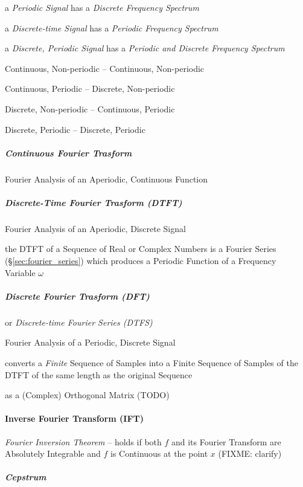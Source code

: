 {a \emph{Periodic Signal} has a \emph{Discrete Frequency Spectrum}

a \emph{Discrete-time Signal} has a \emph{Periodic Frequency Spectrum}

a \emph{Discrete, Periodic Signal} has a \emph{Periodic and Discrete Frequency
  Spectrum}

Continuous, Non-periodic -- Continuous, Non-periodic

Continuous, Periodic -- Discrete, Non-periodic

Discrete, Non-periodic -- Continuous, Periodic

Discrete, Periodic -- Discrete, Periodic



\subparagraph{Continuous Fourier Trasform}
\label{sec:continuous_fourier_transform}\hfill

Fourier Analysis of an Aperiodic, Continuous Function



\subparagraph{Discrete-Time Fourier Trasform (DTFT)}\label{sec:dtft}\hfill

Fourier Analysis of an Aperiodic, Discrete Signal

the DTFT of a Sequence of Real or Complex Numbers is a Fourier Series
(\S\ref{sec:fourier_series}) which produces a Periodic Function of a Frequency
Variable $\omega$



\subparagraph{Discrete Fourier Trasform (DFT)}\label{sec:dft}\hfill

or \emph{Discrete-time Fourier Series (DTFS)}

Fourier Analysis of a Periodic, Discrete Signal

converts a \emph{Finite} Sequence of Samples into a Finite Sequence of Samples
of the DTFT of the same length as the original Sequence

as a (Complex) Orthogonal Matrix (TODO)



\paragraph{Inverse Fourier Transform (IFT)}\label{sec:ift}\hfill

\emph{Fourier Inversion Theorem} -- holds if both $f$ and its Fourier Transform
are Absolutely Integrable and $f$ is Continuous at the point $x$ (FIXME:
clarify)



\subparagraph{Cepstrum}\label{sec:cepstrum}\hfill

}
